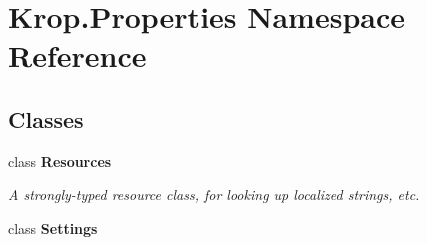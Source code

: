 \hypertarget{namespace_krop_1_1_properties}{}\section{Krop.\+Properties Namespace Reference}
\label{namespace_krop_1_1_properties}
\subsection*{Classes}
\begin{DoxyCompactItemize}
\item 
class {\bfseries Resources}
\begin{DoxyCompactList}\small\item\em A strongly-\/typed resource class, for looking up localized strings, etc. \end{DoxyCompactList}\item 
class {\bfseries Settings}
\end{DoxyCompactItemize}
